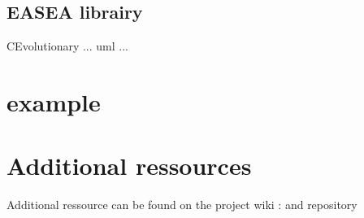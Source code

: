 \documentclass{article}
\begin{document}
  \subsection{EASEA librairy} %
  \label{sub:EASEA library}
  CEvolutionary ... uml ...

\section{example} %
\label{sec:example}


\section{Additional ressources} %
\label{sec:Additional}
Additional ressource can be found on the project wiki : and repository 
\end{document}
